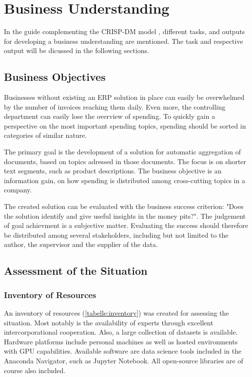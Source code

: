 \chapter{Business Understanding}
In the guide complementing the \ac{CRISP-DM} model \cite{CRISPDM2000}, different tasks, and outputs for developing a business understanding are mentioned. The task and respective output will be dicussed in the following sections.

\section{Business Objectives}
Businesses without existing an \ac{ERP} solution in place can easily be overwhelmed by the number of invoices reaching them daily. Even more, the controlling department can easily lose the overview of spending. To quickly gain a perspective on the most important spending topics, spending should be sorted in categories of similar nature.

The primary goal is the development of a solution for automatic aggregation of documents, based on topics adressed in those documents. The focus is on shorter text segments, such as product descriptions. The business objective is an information gain, on how spending is distributed among cross-cutting topics in a company.

The created solution can be evaluated with the business success criterion: "Does the solution identify and give useful insights in the money pits?". The judgement of goal achievment is a subjective matter. Evaluating the success should therefore be distributed among several stakeholders, including but not limited to the author, the supervisor and the supplier of the data.

\section{Assessment of the Situation}

\subsection{Inventory of Resources}
An inventory of resources (\ref{tabelle:inventory}) was created for assessing the situation. Most notably is the availability of experts through excellent intercorporational cooperation. Also, a large collection of datasets is available. Hardware platforms include personal machines as well as hosted environments with GPU capabilities. Available software are data science tools included in the Anaconda Navigator, such as Jupyter Notebook. All open-source libraries are of course also included.

